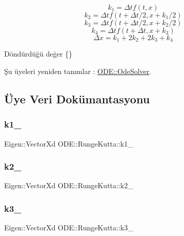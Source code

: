 \[ k_1 = \Delta t f(t,x) \] \[ k_2 = \Delta t f(t+\Delta t/2,x+k_1/2) \] \[ k_3 = \Delta t f(t+\Delta t/2,x+k_2/2) \] \[ k_4 = \Delta t f(t+\Delta t,x+k_3) \] \[ \Delta x = k_1 + 2 k_2 + 2 k_3 + k_4 \] \begin{DoxyReturn}{Döndürdüğü değer}
\{\} 
\end{DoxyReturn}


Şu üyeleri yeniden tanımlar \+: \mbox{\hyperlink{classODE_1_1OdeSolver_a000187013258d0b43ffd8a14486e7ab8}{O\+D\+E\+::\+Ode\+Solver}}.



\subsection{Üye Veri Dokümantasyonu}
\mbox{\label{classODE_1_1RungeKutta_ac19d5705a3f6b4bb3afc733cc3ae6e12}} 
\subsubsection{\texorpdfstring{k1\_}{k1\_}}
{\footnotesize\ttfamily Eigen\+::\+Vector\+Xd O\+D\+E\+::\+Runge\+Kutta\+::k1\+\_\+\hspace{0.3cm}{\ttfamily [protected]}}

\mbox{\label{classODE_1_1RungeKutta_a001c906e3a7ae731bf77e60a35b5258c}} 
\subsubsection{\texorpdfstring{k2\_}{k2\_}}
{\footnotesize\ttfamily Eigen\+::\+Vector\+Xd O\+D\+E\+::\+Runge\+Kutta\+::k2\+\_\+\hspace{0.3cm}{\ttfamily [protected]}}

\mbox{\label{classODE_1_1RungeKutta_a5231484792516296abbd6b14a63f25e4}} 
\subsubsection{\texorpdfstring{k3\_}{k3\_}}
{\footnotesize\ttfamily Eigen\+::\+Vector\+Xd O\+D\+E\+::\+Runge\+Kutta\+::k3\+\_\+\hspace{0.3cm}{\ttfamily [protected]}}

